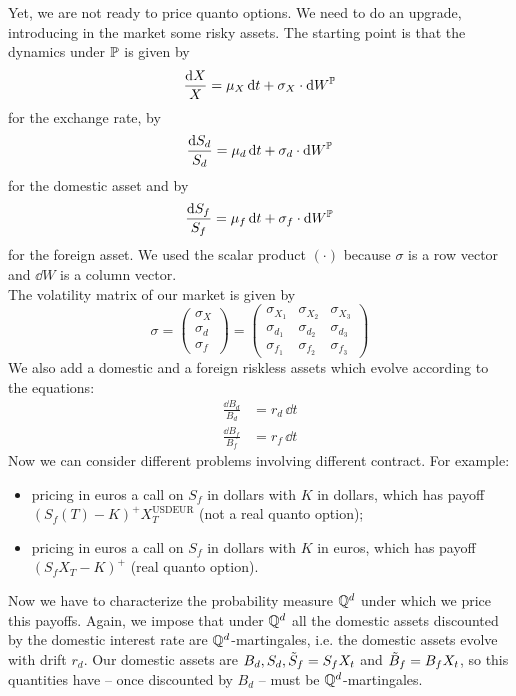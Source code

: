 Yet, we are not ready to price quanto options. We need to do an upgrade, introducing in the market some risky assets. The starting point is that the dynamics under $\mathbb{P}$ is given by
\begin{equation}
    \frac{\dd X}{X} = \mu_X\,\dd t + \sigma_X\cdot\dd W^{\mathbb{P}}
\end{equation}
for the exchange rate, by
\begin{equation}\label{Sd}
    \frac{\dd S_d}{S_d} = \mu_d\,\dd t + \sigma_d\cdot\dd W^{\mathbb{P}}
\end{equation}\label{Sf}
for the domestic asset and by
\begin{equation}
    \frac{\dd S_f}{S_f} = \mu_f\,\dd t + \sigma_f\cdot\dd W^{\mathbb{P}}
\end{equation}
for the foreign asset. We used the scalar product $(\cdot)$ because $\sigma$ is a row vector and $\dd W$ is a column vector.\\
The volatility matrix of our market is given by
\begin{equation}
    \sigma =
    \begin{pmatrix}
    \sigma_X \\ \sigma_d \\ \sigma_f
    \end{pmatrix} =
    \begin{pmatrix}
    \sigma_{X_1} & \sigma_{X_2} & \sigma_{X_3} \\
    \sigma_{d_1} & \sigma_{d_2} & \sigma_{d_3} \\
    \sigma_{f_1} & \sigma_{f_2} & \sigma_{f_3}
    \end{pmatrix}
\end{equation}
We also add a domestic and a foreign riskless assets which evolve according to the equations:
\begin{align}
    \frac{\dd B_d}{B_d} &= r_d\,\dd t \\
    \frac{\dd B_f}{B_f} &= r_f\,\dd t
\end{align}
Now we can consider different problems involving different contract. For example:
\begin{itemize}
    \item pricing in euros a call on $S_f$ in dollars with $K$ in dollars, which has payoff $(S_f(T)-K)^+X_T^{\text{USDEUR}}$ (not a real quanto option);
    \item pricing in euros a call on $S_f$ in dollars with $K$ in euros, which has payoff $(S_fX_T-K)^+$ (real quanto option).
\end{itemize}
Now we have to characterize the probability measure $\mathbb{Q}^d$ under which we price this payoffs. Again, we impose that under $\mathbb{Q}^d$ all the domestic assets discounted by the domestic interest rate are $\mathbb{Q}^d$-martingales, i.e. the domestic assets evolve with drift $r_d$. Our domestic assets are $B_d, S_d, \Tilde{S}_f = S_fX_t$ and $\Tilde{B}_f = B_fX_t$, so this quantities have -- once discounted by $B_d$ -- must be $\mathbb{Q}^d$-martingales.\\
